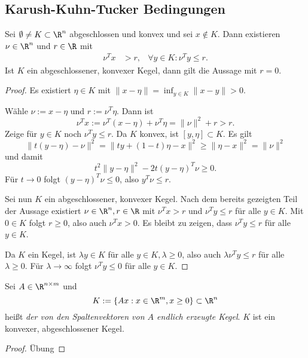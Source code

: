 \subsection{Karush-Kuhn-Tucker Bedingungen}


\begin{lem} \label{3.23}
	Sei $\emptyset \neq K \subset \R^n$ abgeschlossen und konvex und sei $x \not\in K$.
	Dann existieren $\nu \in \R^n$ und $r \in \R$ mit
	\begin{align*}
		\nu^T x &> r, &
		\forall y \in K : \nu^T y \le r.
	\end{align*}
	Ist $K$ ein abgeschlossener, konvexer Kegel, dann gilt die Aussage mit $r = 0$.
	\begin{proof}
		Es existiert $\eta \in K$ mit $\|x - \eta\| = \inf_{y\in K} \|x-y\| > 0$.

		Wähle $\nu := x - \eta$ und $r := \nu^T \eta$.
		Dann ist
		\[
			\nu^T x := \nu^T (x- \eta) + \nu^T \eta = \|\nu\|^2 + r > r.
		\]
		Zeige für $y \in K$ noch $\nu^T y \le r$.
		Da $K$ konvex, ist $[y, \eta] \subset K$.
		Es gilt
		\[
			\|t(y - \eta) - \nu\|^2
			 = \|ty + (1-t)\eta - x \|^2
			 \ge \|\eta - x\|^2
			= \|\nu\|^2
		\]
		und damit
		\[
			t^2 \|y-\eta\|^2 - 2t(y-\eta)^T \nu \ge 0.
		\]
		Für $t \to 0$ folgt $(y-\eta)^T \nu \le 0$, also $y^T \nu \le r$.

		Sei nun $K$ ein abgeschlossener, konvexer Kegel.
		Nach dem bereits gezeigten Teil der Aussage existiert $\nu \in \R^n, r \in \R$ mit $\nu^T x > r$ und $\nu^T y \le r$ für alle $y \in K$.
		Mit $0 \in K$ folgt $r \ge 0$, also auch $\nu^T x > 0$.
		Es bleibt zu zeigen, dass $\nu^T y \le r$ für alle $y \in K$.

		Da $K$ ein Kegel, ist $\lambda y \in K$ für alle $y \in K, \lambda \ge 0$, also auch $\lambda \nu^T y \le r$ für alle $\lambda \ge 0$.
		Für $\lambda \to \infty$ folgt $\nu^T y \le 0$ für alle $y \in K$.
	\end{proof}
\end{lem}

\begin{st} \label{3.24}
	Sei $A \in \R^{n \times m}$ und
	\[
		K := \{ Ax : x \in \R^m, x \ge 0 \} \subset \R^n
	\]
	heißt \emph{der von den Spaltenvektoren von $A$ endlich erzeugte Kegel}.
	$K$ ist ein konvexer, abgeschlossener Kegel.
	\begin{proof}
		Übung
	\end{proof}
\end{st}

